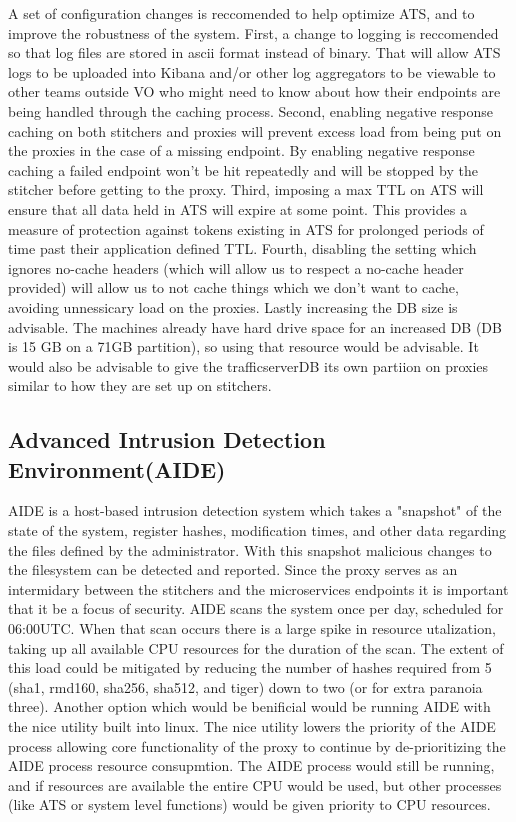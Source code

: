 \documentclass{article}
\begin{document}
A set of configuration changes is reccomended to help optimize ATS, and to improve the robustness of the system. First, a change to logging is reccomended so that log files are stored in ascii format instead of binary. That will allow ATS logs to be uploaded into Kibana and/or other log aggregators to be viewable to other teams outside VO who might need to know about how their endpoints are being handled through the caching process. Second, enabling negative response caching on both stitchers and proxies will prevent excess load from being put on the proxies in the case of a missing endpoint. By enabling negative response caching a failed endpoint won't be hit repeatedly and will be stopped by the stitcher before getting to the proxy. Third, imposing a max TTL on ATS will ensure that all data held in ATS will expire at some point. This provides a measure of protection against tokens existing in ATS for prolonged periods of time past their application defined TTL. Fourth, disabling the setting which ignores no-cache headers (which will allow us to respect a no-cache header provided) will allow us to not cache things which we don't want to cache, avoiding unnessicary load on the proxies. Lastly increasing the DB size is advisable. The machines already have hard drive space for an increased DB (DB is 15 GB on a 71GB partition), so using that resource would be advisable. It would also be advisable to give the trafficserverDB its own partiion on proxies similar to how they are set up on stitchers. 



\subsection{Advanced Intrusion Detection Environment(AIDE)}
\label{SECTION-AIDE}

AIDE is a host-based intrusion detection system which takes a "snapshot" of the state of the system, register hashes, modification times, and other data regarding the files defined by the administrator. With this snapshot malicious changes to the filesystem can be detected and reported. Since the proxy serves as an intermidary between the stitchers and the microservices endpoints it is important that it be a focus of security. AIDE scans the system once per day, scheduled for 06:00UTC. When that scan occurs there is a large spike in resource utalization, taking up all available CPU resources for the duration of the scan. The extent of this load could be mitigated by reducing the number of hashes required from 5 (sha1, rmd160, sha256, sha512, and tiger) down to two (or for extra paranoia three). Another option which would be benificial would be running AIDE with the nice utility built into linux. The nice utility lowers the priority of the AIDE process allowing core functionality of the proxy to continue by de-prioritizing the AIDE process resource consupmtion. The AIDE process would still be running, and if resources are available the entire CPU would be used, but other processes (like ATS or system level functions) would be given priority to CPU resources. 
\end{document}
